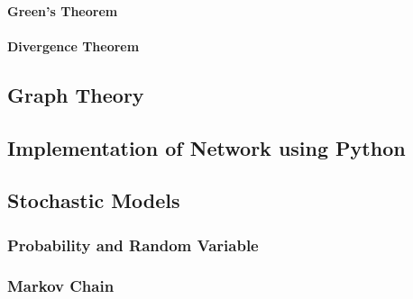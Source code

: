 \paragraph{Green's Theorem} 

\paragraph{Divergence Theorem} 


\subsection{Graph Theory} 



\subsection{Implementation of Network using Python}

\subsection{Stochastic Models} 

\subsubsection{Probability and Random Variable} 

\subsubsection{Markov Chain} 







